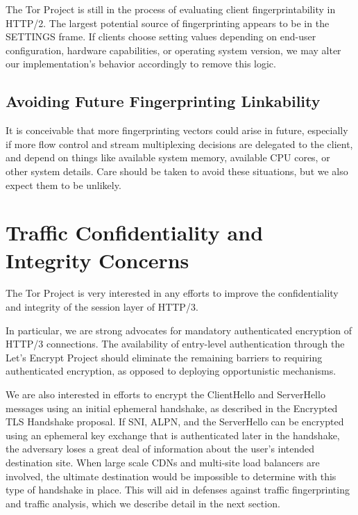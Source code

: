 \documentclass[letterpaper,11pt]{llncs}
\begin{document}
The Tor Project is still in the process of evaluating client
fingerprintability in HTTP/2. The largest potential source of fingerprinting
appears to be in the SETTINGS frame. If clients choose setting values
depending on end-user configuration, hardware capabilities, or operating
system version, we may alter our implementation's behavior accordingly to
remove this logic.

\subsection{Avoiding Future Fingerprinting Linkability}

It is conceivable that more fingerprinting vectors could arise in future,
especially if more flow control and stream multiplexing decisions are
delegated to the client, and depend on things like available system memory,
available CPU cores, or other system details. Care should be taken to avoid
these situations, but we also expect them to be unlikely.

\section{Traffic Confidentiality and Integrity Concerns}

The Tor Project is very interested in any efforts to improve the
confidentiality and integrity of the session layer of HTTP/3. 

In particular, we are strong advocates for mandatory authenticated encryption
of HTTP/3 connections.  The availability of entry-level authentication through
the Let's Encrypt Project should eliminate the remaining barriers to requiring
authenticated encryption, as opposed to deploying opportunistic mechanisms.

We are also interested in efforts to encrypt the ClientHello and ServerHello
messages using an initial ephemeral handshake, as described in the Encrypted
TLS Handshake proposal. If SNI, ALPN, and the ServerHello can be encrypted
using an ephemeral key exchange that is authenticated later in the handshake,
the adversary loses a great deal of information about the user's intended
destination site. When large scale CDNs and multi-site load balancers are
involved, the ultimate destination would be impossible to determine with this
type of handshake in place. This will aid in defenses against traffic
fingerprinting and traffic analysis, which we describe detail in the next
section.
\end{document}

